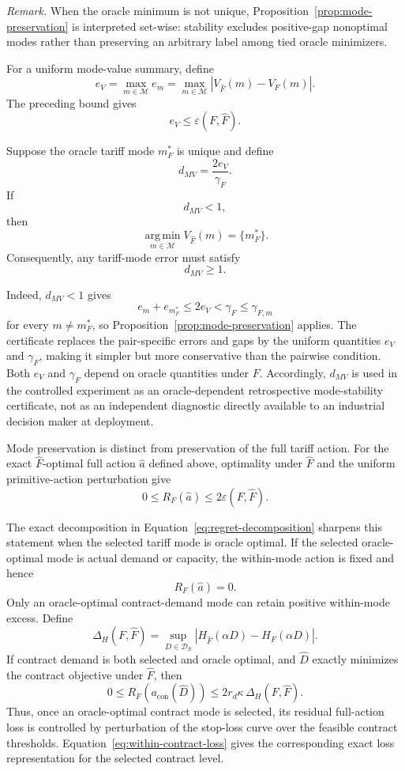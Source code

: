\documentclass[Times1COL]{WileyNJDv5}
\begin{document}
\noindent\textit{Remark.}
When the oracle minimum is not unique,
Proposition~\ref{prop:mode-preservation} is interpreted set-wise:
stability excludes positive-gap nonoptimal modes rather than preserving
an arbitrary label among tied oracle minimizers.

For a uniform mode-value summary, define
\[
e_V
=
\max_{m\in\mathcal M} e_m
=
\max_{m\in\mathcal M}
\left|
V_{\widehat F}(m)-V_F(m)
\right|.
\]
The preceding bound gives
\[
e_V
\leq
\varepsilon(F,\widehat F).
\]

\begin{corollary}
\label{cor:mode-value-certificate}
Suppose the oracle tariff mode $m_F^\ast$ is unique and define
\[
d_{MV}
=
\frac{2e_V}{\gamma_F}.
\]
If
\[
d_{MV}<1,
\]
then
\[
\operatorname*{arg\,min}_{m\in\mathcal M}
V_{\widehat F}(m)
=
\{m_F^\ast\}.
\]
Consequently, any tariff-mode error must satisfy
\[
d_{MV}\geq1.
\]
\end{corollary}

\noindent
Indeed, $d_{MV}<1$ gives
\[
e_m+e_{m_F^\ast}
\leq
2e_V
<
\gamma_F
\leq
\gamma_{F,m}
\]
for every $m\neq m_F^\ast$, so Proposition~\ref{prop:mode-preservation}
applies. The certificate replaces the pair-specific errors and gaps by
the uniform quantities $e_V$ and $\gamma_F$, making it simpler but
more conservative than the pairwise condition. Both $e_V$ and
$\gamma_F$ depend on oracle quantities under $F$. Accordingly,
$d_{MV}$ is used in the controlled experiment as an oracle-dependent
retrospective mode-stability certificate, not as an independent
diagnostic directly available to an industrial decision maker at
deployment.

Mode preservation is distinct from preservation of the full tariff
action. For the exact $\widehat F$-optimal full action $\widehat a$
defined above, optimality under $\widehat F$ and the uniform
primitive-action perturbation give
\begin{equation}
\label{eq:regret-bound}
0
\leq
R_F(\widehat a)
\leq
2\varepsilon(F,\widehat F).
\end{equation}

The exact decomposition in
Equation~\eqref{eq:regret-decomposition} sharpens this statement when
the selected tariff mode is oracle optimal. If the selected
oracle-optimal mode is actual demand or capacity, the within-mode
action is fixed and hence
\[
R_F(\widehat a)=0.
\]
Only an oracle-optimal contract-demand mode can retain positive
within-mode excess. Define
\[
\Delta_H(F,\widehat F)
=
\sup_{D\in\mathcal D_S}
\left|
H_{\widehat F}(\alpha D)-H_F(\alpha D)
\right|.
\]
If contract demand is both selected and oracle optimal, and
$\widehat D$ exactly minimizes the contract objective under
$\widehat F$, then
\begin{equation}
\label{eq:contract-regret-bound}
0
\leq
R_F\!\left(a_{\mathrm{con}}(\widehat D)\right)
\leq
2r_d\kappa\,\Delta_H(F,\widehat F).
\end{equation}
Thus, once an oracle-optimal contract mode is selected, its residual
full-action loss is controlled by perturbation of the stop-loss curve
over the feasible contract thresholds.
Equation~\eqref{eq:within-contract-loss} gives the corresponding
exact loss representation for the selected contract level.
\end{document}
